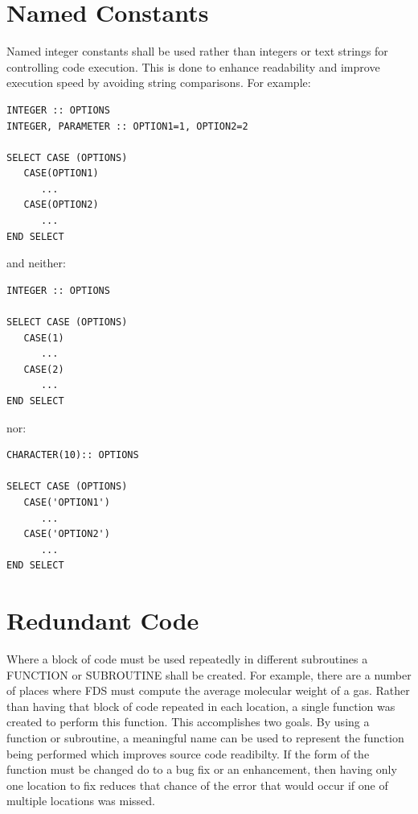 \documentclass[11pt]{book}
\newcommand{\nopart}{\expandafter\def\csname Parent-1\endcsname{}} %
\begin{document}
\section{Named Constants}

Named integer constants shall be used rather than integers or text strings for controlling code execution.  This
is done to enhance readability and improve execution speed by avoiding string comparisons.  For example:

\begin{verbatim}
INTEGER :: OPTIONS
INTEGER, PARAMETER :: OPTION1=1, OPTION2=2

SELECT CASE (OPTIONS) 
   CASE(OPTION1)
      ...
   CASE(OPTION2)
      ...
END SELECT
\end{verbatim}

and neither:
\begin{verbatim}
INTEGER :: OPTIONS

SELECT CASE (OPTIONS) 
   CASE(1)
      ...
   CASE(2)
      ...
END SELECT
\end{verbatim}

nor:
\begin{verbatim}
CHARACTER(10):: OPTIONS

SELECT CASE (OPTIONS) 
   CASE('OPTION1')
      ...
   CASE('OPTION2')
      ...
END SELECT
\end{verbatim}

\section{Redundant Code}

Where a block of code must be used repeatedly in different subroutines a {\ct FUNCTION} or {\ct SUBROUTINE}
shall be created.  For example, there are a number of places where FDS must compute the average molecular weight
of a gas.  Rather than having that block of code repeated in each location, a single function was created to
perform this function.  This accomplishes two goals.  By using a function or subroutine, a meaningful name can
be used to represent the function being performed which improves source code readibilty.  If the form of the
function must be changed do to a bug fix or an enhancement, then having only one location to fix reduces that
chance of the error that would occur if one of multiple locations was missed.

\backmatter
\nopart %



\printindex
\end{document}
